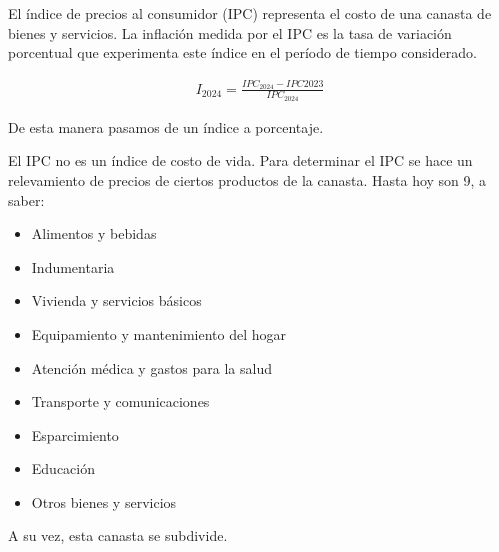 El índice de precios al consumidor (IPC) 
representa el costo de una canasta de bienes y servicios.
La inflación medida por el IPC es la tasa de variación porcentual 
que experimenta este índice en el período de tiempo considerado.

\begin{align*}
    I_{2024} = \frac{IPC_{2024}-IPC{2023}}{IPC_{2024}}
\end{align*}

De esta manera pasamos de un índice a porcentaje.

El IPC no es un índice de costo de vida.
Para determinar el IPC se hace un relevamiento de precios 
de ciertos productos de la canasta.
Hasta hoy son 9, a saber:
\begin{itemize}
    \item Alimentos y bebidas
    \item Indumentaria
    \item Vivienda y servicios básicos
    \item Equipamiento y mantenimiento del hogar
    \item Atención médica y gastos para la salud 
    \item Transporte y comunicaciones
    \item Esparcimiento
    \item Educación
    \item Otros bienes y servicios 
\end{itemize}

A su vez,
esta canasta se subdivide.